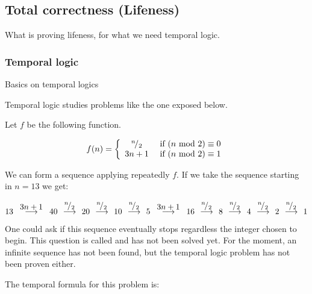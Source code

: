 \subsection{Total correctness (Lifeness)}

What is proving lifeness, for what we need temporal logic.

\subsubsection{Temporal logic}

Basics on temporal logics

Temporal logic studies problems like the one exposed below.

\begin{example}
\label{Collatz:conjecture}

Let $f$ be the following function.

\[
f(n) = \left\{
	\begin{array}{cc}
		{}^{n}\!/_{2} & \text{ if } (n\text{ mod } 2) \equiv 0\\
		3n+1 & \text{ if } (n\text{ mod } 2) \equiv 1
	\end{array}
\right.
\]

We can form a sequence applying repeatedly $f$. If we take the sequence starting in $n=13$ we get:

\[ 
	13 \overset{\displaystyle\;\; 3n+1\;\;}{\longrightarrow}
	40 \overset{\displaystyle\;\;{}^{n}\!/_{2}\;\;}{\longrightarrow}
	20 \overset{\displaystyle\;\;{}^{n}\!/_{2}\;\;}{\longrightarrow}
	10 \overset{\displaystyle\;\;{}^{n}\!/_{2}\;\;}{\longrightarrow}
	5 \overset{\displaystyle\;\; 3n+1\;\;}{\longrightarrow}
	16 \overset{\displaystyle\;\;{}^{n}\!/_{2}\;\;}{\longrightarrow}
	8 \overset{\displaystyle\;\;{}^{n}\!/_{2}\;\;}{\longrightarrow}
	4 \overset{\displaystyle\;\;{}^{n}\!/_{2}\;\;}{\longrightarrow}
	2 \overset{\displaystyle\;\;{}^{n}\!/_{2}\;\;}{\longrightarrow}
	1
\]

One could ask if this sequence eventually stops regardless the integer chosen to begin. This question is called  and has not been solved yet. 
For the moment, an infinite sequence has not been found, but the temporal logic problem has not been proven either.

The temporal formula for this problem is:

\[

\]


\end{example}


